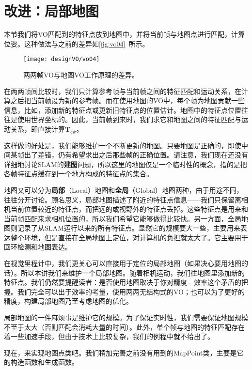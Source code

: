 \section{改进：局部地图}
本节我们将VO匹配到的特征点放到地图中，并将当前帧与地图点进行匹配，计算位姿。这种做法与之前的差异如\autoref{fig:vo04}~所示。

\begin{figure}[!htp]
	\centering    
	\texttt{[image: designVO/vo04]}\\
	\caption{两两帧VO与地图VO工作原理的差异。}
	\label{fig:vo04}
\end{figure}

在两两帧间比较时，我们只计算参考帧与当前帧之间的特征匹配和运动关系，在计算之后把当前帧设为新的参考帧。而在使用地图的VO中，每个帧为地图贡献一些信息，比如，添加新的特征点或更新旧特征点的位置估计。地图中的特征点位置往往是使用世界坐标的。因此，当前帧到来时，我们求它和地图之间的特征匹配与运动关系，即直接计算$\bm{T}_{\mathrm{cw}}$。

\newpage
这样做的好处是，我们能够维护一个不断更新的地图。只要地图是正确的，即使中间某帧出了差错，仍有希望求出之后那些帧的正确位置。请注意，我们现在还没有详细地讨论SLAM的\textbf{建图}问题，所以这里的地图仅是一个临时性的概念，指的是把各帧特征点缓存到一个地方构成的特征点的集合。

地图又可以分为\textbf{局部}（Local）地图和\textbf{全局}（Global）地图两种，由于用途不同，往往分开讨论。顾名思义，局部地图描述了附近的特征点信息——我们只保留离相机当前位置较近的特征点，而把远的或视野外的特征点丢掉。这些特征点是用来和当前帧匹配来求相机位置的，所以我们希望它能够做得比较快。另一方面，全局地图则记录了从SLAM运行以来的所有特征点。显然它的规模要大一些，主要用来表达整个环境，但是直接在全局地图上定位，对计算机的负担就太大了。它主要用于回环检测和地图表达。

在视觉里程计中，我们更关心可以直接用于定位的局部地图（如果决心要用地图的话）。所以本讲我们来维护一个局部地图。随着相机运动，我们往地图里添加新的特征点。我们仍然要提醒读者：是否使用地图取决于你对精度—效率这个矛盾的把握。我们完全可以出于效率的考量，使用两两无结构式的VO；也可以为了更好的精度，构建局部地图乃至考虑地图的优化。

局部地图的一件麻烦事是维护它的规模。为了保证实时性，我们需要保证地图规模不至于太大（否则匹配会消耗大量的时间）。此外，单个帧与地图的特征匹配存在着一些加速手段，但由于技术上比较复杂，我们的例程中就不给出了。

现在，来实现地图点类吧。我们稍加完善之前没有用到的MapPoint类，主要是它的构造函数和生成函数。

